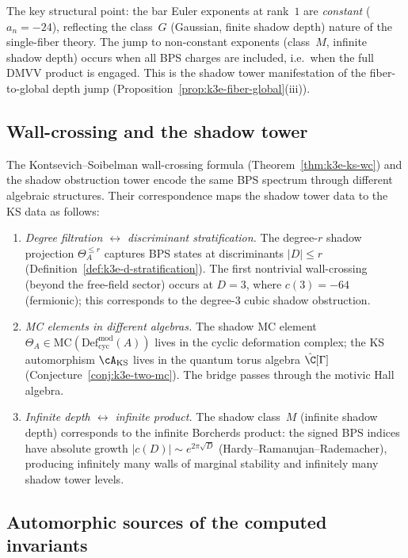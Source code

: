 \noindent The key structural point: the bar Euler exponents at rank~$1$ are \emph{constant} ($a_n = -24$), reflecting the class~$G$ (Gaussian, finite shadow depth) nature of the single-fiber theory. The jump to non-constant exponents (class~$M$, infinite shadow depth) occurs when all BPS charges are included, i.e.\ when the full DMVV product is engaged. This is the shadow tower manifestation of the fiber-to-global depth jump (Proposition~\ref{prop:k3e-fiber-global}(iii)).

\subsection{Wall-crossing and the shadow tower}
\label{subsec:k3e-wc-shadow}

The Kontsevich--Soibelman wall-crossing formula (Theorem~\ref{thm:k3e-ks-wc}) and the shadow obstruction tower encode the same BPS spectrum through different algebraic structures. Their correspondence maps the shadow tower data to the KS data as follows:

\begin{enumerate}[label=(\roman*)]
\item \emph{Degree filtration $\leftrightarrow$ discriminant stratification.} The degree-$r$ shadow projection $\Theta_A^{\leq r}$ captures BPS states at discriminants $|D| \leq r$ (Definition~\ref{def:k3e-d-stratification}). The first nontrivial wall-crossing (beyond the free-field sector) occurs at $D = 3$, where $c(3) = -64$ (fermionic); this corresponds to the degree-$3$ cubic shadow obstruction.

\item \emph{MC elements in different algebras.} The shadow MC element $\Theta_A \in \mathrm{MC}(\mathrm{Def}_{\mathrm{cyc}}^{\mathrm{mod}}(A))$ lives in the cyclic deformation complex; the KS automorphism $\cA_{\mathrm{KS}}$ lives in the quantum torus algebra $\hat{\C}[\Gamma]$ (Conjecture~\ref{conj:k3e-two-mc}). The bridge passes through the motivic Hall algebra.

\item \emph{Infinite depth $\leftrightarrow$ infinite product.} The shadow class~$M$ (infinite shadow depth) corresponds to the infinite Borcherds product: the signed BPS indices have absolute growth $|c(D)| \sim e^{2\pi\sqrt{D}}$ (Hardy--Ramanujan--Rademacher), producing infinitely many walls of marginal stability and infinitely many shadow tower levels.
\end{enumerate}

\subsection{Automorphic sources of the computed invariants}
\label{subsec:k3e-novelty}

